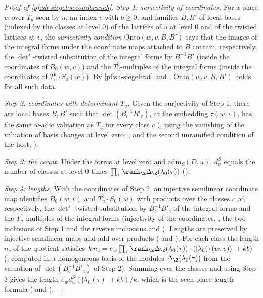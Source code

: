 \begin{proof}[Proof of \cref{pf:sh-siegel:secondbranch}]
\emph{Step 1: surjectivity of coordinates.} For a place $w$ over $T_u$ seen by $u$, an index $v$ with $b\ge0$, and families $B,B'$
of local bases (indexed by the classes at level $0$) of the lattices of $u$ at level $0$ and of the twisted lattices at $v$, the
\emph{surjectivity condition} $\mathrm{Onto}(w,v,B,B')$ says that the images of the integral forms under the coordinate maps
attached to $B$ contain, respectively, the $\det^{s}$-twisted substitution of the integral forms by $B^{-1}B'$ (inside the
coordinates of $B_0(w,v)$) and the $T_u^b$-multiples of the integral forms (inside the coordinates of $T_u^b\cdot S_0(w)$). By
\cref{pf:sh-siegel:rat} and , $\mathrm{Onto}(w,v,B,B')$ holds for all
such data.

\emph{Step 2: coordinates with determinant $T_u$.} Given the surjectivity of Step 1, there are local bases $B,B'$ such that
$\det(B_c^{-1}B'_c)$, at the embedding $\tau(w,v)$, has the same $w$-adic valuation as $T_u$ for every class $c$
(, using the vanishing of the valuation of
basis changes at level zero, , and the second
unramified condition of the host, ).

\emph{Step 3: the count.} Under the forms at level zero and $\mathrm{adm}_S(D,u)$, $d^S_u$ equals the number of classes at level $0$
times $\prod_\tau\rank_\Z\Delta_\Z(\lambda_0(\tau))$ ().

\emph{Step 4: lengths.} With the coordinates of Step 2, an injective semilinear coordinate map identifies $B_0(w,v)$ and
$T_u^b\cdot S_0(w)$ with products over the classes $c$ of, respectively, the $\det^s$-twisted substitution by $B_c^{-1}B'_c$ of the
integral forms and the $T_u^b$-multiples of the integral forms (injectivity of the coordinates,
, the two inclusions of Step 1 and the reverse inclusions
 and ). Lengths are
preserved by injective semilinear maps and add over products
( and ). For
each class the length $n_c$ of the quotient satisfies
$k\,n_c=e_w\prod_\tau\rank_\Z\Delta_\Z(\lambda_0(\tau))\cdot(|\lambda_0(\tau(w,v))|+kb)$
(, computed in a homogeneous basis of the modules $\Delta_\Z(\lambda_0(\tau))$
from the valuation of $\det(B_c^{-1}B'_c)$ of Step 2). Summing over the classes and using Step 3 gives the length
$e_wd^S_u(|\lambda_0(\tau)|+kb)/k$, which is the seen-place length formula
( and ).


\end{proof}
